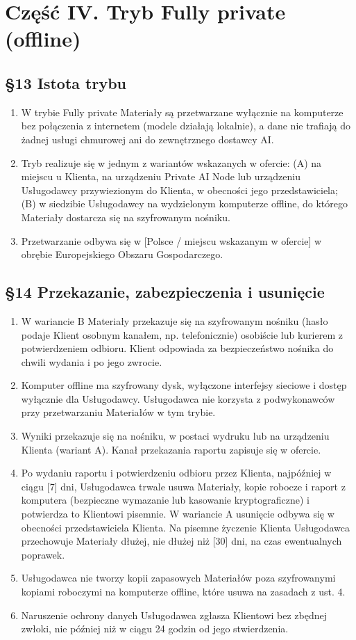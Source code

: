 \documentclass[11pt,a4paper]{article}
\begin{document}
\section*{Część IV. Tryb Fully private (offline)}

\subsection*{§13 Istota trybu}
\begin{enumerate}
\item W trybie Fully private Materiały są przetwarzane wyłącznie na komputerze bez połączenia z internetem (modele działają lokalnie), a dane nie trafiają do żadnej usługi chmurowej ani do zewnętrznego dostawcy AI.
\item Tryb realizuje się w jednym z wariantów wskazanych w ofercie: (A) na miejscu u Klienta, na urządzeniu Private AI Node lub urządzeniu Usługodawcy przywiezionym do Klienta, w obecności jego przedstawiciela; (B) w siedzibie Usługodawcy na wydzielonym komputerze offline, do którego Materiały dostarcza się na szyfrowanym nośniku.
\item Przetwarzanie odbywa się w [Polsce / miejscu wskazanym w ofercie] w obrębie Europejskiego Obszaru Gospodarczego.
\end{enumerate}

\subsection*{§14 Przekazanie, zabezpieczenia i usunięcie}
\begin{enumerate}
\item W wariancie B Materiały przekazuje się na szyfrowanym nośniku (hasło podaje Klient osobnym kanałem, np. telefonicznie) osobiście lub kurierem z potwierdzeniem odbioru. Klient odpowiada za bezpieczeństwo nośnika do chwili wydania i po jego zwrocie.
\item Komputer offline ma szyfrowany dysk, wyłączone interfejsy sieciowe i dostęp wyłącznie dla Usługodawcy. Usługodawca nie korzysta z podwykonawców przy przetwarzaniu Materiałów w tym trybie.
\item Wyniki przekazuje się na nośniku, w postaci wydruku lub na urządzeniu Klienta (wariant A). Kanał przekazania raportu zapisuje się w ofercie.
\item Po wydaniu raportu i potwierdzeniu odbioru przez Klienta, najpóźniej w ciągu [7] dni, Usługodawca trwale usuwa Materiały, kopie robocze i raport z komputera (bezpieczne wymazanie lub kasowanie kryptograficzne) i potwierdza to Klientowi pisemnie. W wariancie A usunięcie odbywa się w obecności przedstawiciela Klienta. Na pisemne życzenie Klienta Usługodawca przechowuje Materiały dłużej, nie dłużej niż [30] dni, na czas ewentualnych poprawek.
\item Usługodawca nie tworzy kopii zapasowych Materiałów poza szyfrowanymi kopiami roboczymi na komputerze offline, które usuwa na zasadach z ust. 4.
\item Naruszenie ochrony danych Usługodawca zgłasza Klientowi bez zbędnej zwłoki, nie później niż w ciągu 24 godzin od jego stwierdzenia.
\end{enumerate}
\end{document}
